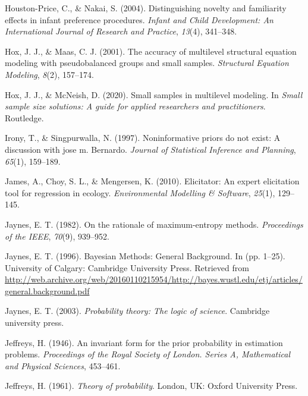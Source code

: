 \documentclass[openright,titlepage,12pt,a4paper]{book}
\begin{document}
\leavevmode\hypertarget{ref-houston-price_distinguishing_2004}{}%
Houston-Price, C., \& Nakai, S. (2004). Distinguishing novelty and familiarity effects in infant preference procedures. \emph{Infant and Child Development: An International Journal of Research and Practice}, \emph{13}(4), 341--348.

\leavevmode\hypertarget{ref-hox_accuracy_2001}{}%
Hox, J. J., \& Maas, C. J. (2001). The accuracy of multilevel structural equation modeling with pseudobalanced groups and small samples. \emph{Structural Equation Modeling}, \emph{8}(2), 157--174.

\leavevmode\hypertarget{ref-hox_small_2020}{}%
Hox, J. J., \& McNeish, D. (2020). Small samples in multilevel modeling. In \emph{Small sample size solutions: A guide for applied researchers and practitioners}. Routledge.

\leavevmode\hypertarget{ref-irony_noninformative_1997}{}%
Irony, T., \& Singpurwalla, N. (1997). Noninformative priors do not exist: A discussion with jose m. Bernardo. \emph{Journal of Statistical Inference and Planning}, \emph{65}(1), 159--189.

\leavevmode\hypertarget{ref-james_elicitator:_2010}{}%
James, A., Choy, S. L., \& Mengersen, K. (2010). Elicitator: An expert elicitation tool for regression in ecology. \emph{Environmental Modelling \& Software}, \emph{25}(1), 129--145.

\leavevmode\hypertarget{ref-jaynes_rationale_1982}{}%
Jaynes, E. T. (1982). On the rationale of maximum-entropy methods. \emph{Proceedings of the IEEE}, \emph{70}(9), 939--952.

\leavevmode\hypertarget{ref-jaynes_bayesian_1996}{}%
Jaynes, E. T. (1996). Bayesian Methods: General Background. In (pp. 1--25). University of Calgary: Cambridge University Press. Retrieved from \url{http://web.archive.org/web/20160110215954/http://bayes.wustl.edu/etj/articles/general.background.pdf}

\leavevmode\hypertarget{ref-jaynes_probability_2003}{}%
Jaynes, E. T. (2003). \emph{Probability theory: The logic of science}. Cambridge university press.

\leavevmode\hypertarget{ref-jeffreys_invariant_1946}{}%
Jeffreys, H. (1946). An invariant form for the prior probability in estimation problems. \emph{Proceedings of the Royal Society of London. Series A, Mathematical and Physical Sciences}, 453--461.

\leavevmode\hypertarget{ref-jeffreys_theory_1961}{}%
Jeffreys, H. (1961). \emph{Theory of probability}. London, UK: Oxford University Press.
\end{document}
